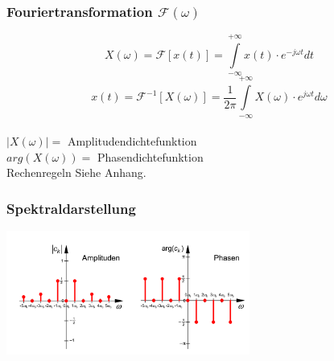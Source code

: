 \begin{multicols}{2}

  \subsubsection*{Fouriertransformation $\mathcal{F}(\omega)$}
  $$ X(\omega) = \mathcal{F}[x(t)] = \int \limits _{-\infty} ^{+\infty} x(t) \cdot e^{-j \omega t} dt $$
  $$ x(t) = \mathcal{F}^{-1}[X(\omega)] = \frac{1}{2 \pi} \int \limits _{- \infty} ^{+ \infty} X(\omega) \cdot e^{j \omega t} d\omega$$
  \\{\tiny $\left|X(\omega)\right| =$ Amplitudendichtefunktion}
  \\{\tiny $arg(X(\omega)) =$ Phasendichtefunktion}
  \\[5pt] Rechenregeln Siehe Anhang.


  \subsubsection*{Spektraldarstellung}
  \includegraphics[width = 8cm]{include/Integraltransformationen/img/Spektrum.png}
\end{multicols}

